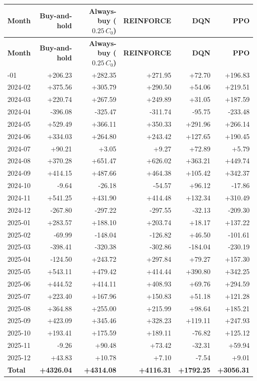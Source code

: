 \begin{longtable}{@{}lrrrrr@{}}
\toprule
\textbf{Month} & \textbf{Buy-and-hold} & \textbf{Always-buy (\(0.25\,C_0\))} & \textbf{REINFORCE} & \textbf{DQN} & \textbf{PPO} \\
\midrule
\endfirsthead
\toprule
\textbf{Month} & \textbf{Buy-and-hold} & \textbf{Always-buy (\(0.25\,C_0\))} & \textbf{REINFORCE} & \textbf{DQN} & \textbf{PPO} \\
\midrule
\endhead
\bottomrule
\endlastfoot
2024-01 & +206.23 & +282.35 & +271.95 & +72.70 & +196.83 \\
2024-02 & +375.56 & +305.79 & +290.50 & +54.06 & +219.51 \\
2024-03 & +220.74 & +267.59 & +249.89 & +31.05 & +187.59 \\
2024-04 & -396.08 & -325.47 & -311.74 & -95.75 & -233.48 \\
2024-05 & +529.49 & +366.11 & +350.33 & +291.96 & +266.14 \\
2024-06 & +334.03 & +264.80 & +243.42 & +127.65 & +190.45 \\
2024-07 & +90.21 & +3.05 & +9.27 & +72.89 & +5.79 \\
2024-08 & +370.28 & +651.47 & +626.02 & +363.21 & +449.74 \\
2024-09 & +414.15 & +487.66 & +464.38 & +105.42 & +342.37 \\
2024-10 & -9.64 & -26.18 & -54.57 & +96.12 & -17.86 \\
2024-11 & +541.25 & +431.90 & +414.48 & +132.34 & +310.49 \\
2024-12 & -267.80 & -297.22 & -297.55 & -32.13 & -209.30 \\
2025-01 & +283.57 & +188.10 & +203.74 & +18.17 & +137.22 \\
2025-02 & -69.99 & -148.04 & -126.82 & +46.50 & -101.61 \\
2025-03 & -398.41 & -320.38 & -302.86 & -184.04 & -230.19 \\
2025-04 & -124.50 & +243.72 & +297.84 & +79.27 & +157.30 \\
2025-05 & +543.11 & +479.42 & +414.44 & +390.80 & +342.25 \\
2025-06 & +444.52 & +414.11 & +408.93 & +69.76 & +294.59 \\
2025-07 & +223.40 & +167.96 & +150.83 & +51.18 & +121.28 \\
2025-08 & +364.88 & +255.00 & +215.99 & +98.64 & +185.21 \\
2025-09 & +423.09 & +345.46 & +328.23 & +119.11 & +247.93 \\
2025-10 & +193.41 & +175.59 & +189.11 & -76.82 & +125.12 \\
2025-11 & -9.26 & +90.48 & +73.42 & -32.31 & +59.94 \\
2025-12 & +43.83 & +10.78 & +7.10 & -7.54 & +9.01 \\
\midrule
\textbf{Total} & \textbf{+4326.04} & \textbf{+4314.08} & \textbf{+4116.31} & \textbf{+1792.25} & \textbf{+3056.31} \\
\end{longtable}

